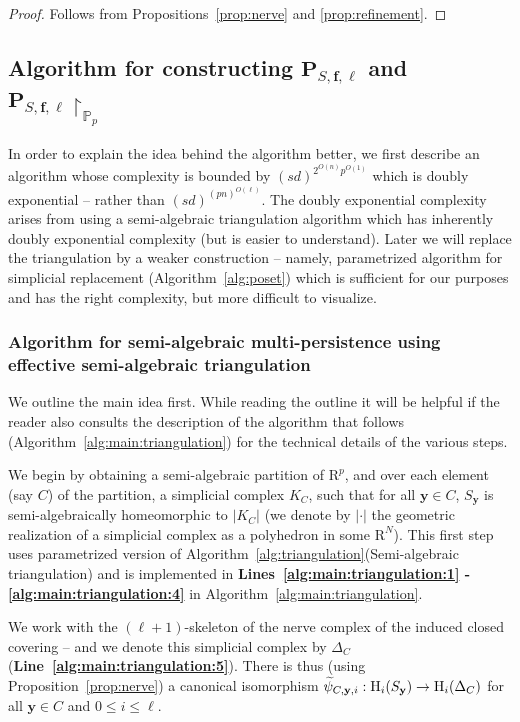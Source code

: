\documentclass{amsart}[10pts]
\theoremstyle{definition}
\theoremstyle{remark}
\theoremstyle{observation}
\numberwithin{equation}{section}
\newcommand {\R} {\mathrm{R}}
\newcommand {\PP}     {\mathbb{P}} %
\newcommand{\HH}  {\mbox{\rm H}}
\newcommand{\y}{\mathbf{y}}
\begin{document}
\begin{proof}
    Follows from Propositions~\ref{prop:nerve} and \ref{prop:refinement}.
\end{proof}

\subsection{Algorithm for constructing $\mathbf{P}_{S,\mathbf{f},\ell}$ and 
$\mathbf{P}_{S,\mathbf{f},\ell}\!\restriction_{\PP_p}$}
In order to explain the idea behind 
the algorithm better,
we first
describe an algorithm 
whose complexity is bounded
by $(sd)^{2^{O(n)}p^{O(1)}}$ which is doubly exponential -- rather than
$(sd)^{( p n)^{O(\ell)}}$.
The doubly exponential complexity arises from using a semi-algebraic triangulation 
algorithm which has inherently doubly exponential complexity (but is easier to understand). Later we will replace the triangulation by a weaker construction -- namely, parametrized algorithm for simplicial replacement (Algorithm~\ref{alg:poset}) which is sufficient for our purposes and 
has the right complexity, but more difficult to visualize.




\subsubsection{Algorithm for semi-algebraic multi-persistence using effective semi-algebraic triangulation}
We outline the main idea first. While reading the outline 
it will be helpful if the reader also consults the description of the algorithm that follows (Algorithm~\ref{alg:main:triangulation}) 
for the technical details of the various steps.  

\medskip
We begin by obtaining a semi-algebraic partition of $\R^p$, and over each element (say $C$) of the partition, a simplicial complex $K_C$, such that for all $\y \in C$, $S_\y$ is semi-algebraically homeomorphic to $|K_C|$ (we denote by $|\cdot|$ the geometric realization of a simplicial complex as a polyhedron in 
some $\R^N$). This first step uses parametrized version of Algorithm~\ref{alg:triangulation}(Semi-algebraic triangulation) and is implemented in \textbf{Lines~\ref{alg:main:triangulation:1} - \ref{alg:main:triangulation:4}} in Algorithm~\ref{alg:main:triangulation}.

\medskip
We work  with  the $(\ell+1)$-skeleton of the  
nerve complex of the induced closed covering -- and we denote this simplicial complex by $\Delta_C$ (\textbf{Line~\ref{alg:main:triangulation:5}}). There is thus (using Proposition~\ref{prop:nerve}) a canonical isomorphism $\widetilde{\psi}_{C,\y,i}:\HH_i(S_\y) \rightarrow \HH_i(\Delta_C)$ for all $\y \in C $ and $0 \leq i \leq \ell$.
\end{document}
